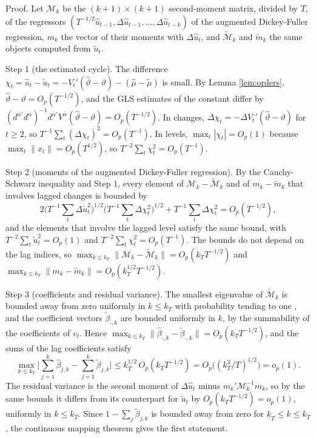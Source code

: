 \documentclass[12pt,a4paper]{article}
\theoremstyle{definition}
\theoremstyle{definition}\newtheorem{example}{Example}
\theoremstyle{definition}\newtheorem{definition}{Definition}
\begin{document}
\noindent Proof. Let $\mathcal M_k$ be the $(k+1)\times(k+1)$ second-moment matrix, divided by $T$, of the regressors $(T^{-1/2}\hat u_{t-1},\Delta\hat u_{t-1},\dots,\Delta\hat u_{t-k})$ of the augmented Dickey-Fuller regression, $m_k$ the vector of their moments with $\Delta\hat u_t$, and $\tilde{\mathcal M}_k$ and $\tilde m_k$ the same objects computed from $\tilde u_t$.

Step 1 (the estimated cycle). The difference $\chi_t=\hat u_t-\tilde u_t=-V_t'(\hat\vartheta-\vartheta)-(\hat\mu-\tilde\mu)$ is small. By Lemma \ref{lem:orders}, $\hat\vartheta-\vartheta=O_p(T^{-1/2})$, and the GLS estimates of the constant differ by $(d^{\bar\alpha\prime}d^{\bar\alpha})^{-1}d^{\bar\alpha\prime}V^{\bar\alpha}(\hat\vartheta-\vartheta)=O_p(T^{-1/2})$. In changes, $\Delta\chi_t=-\Delta V_t'(\hat\vartheta-\vartheta)$ for $t\geq2$, so $T^{-1}\sum_t(\Delta\chi_t)^2=O_p(T^{-1})$. In levels, $\max_t|\chi_t|=O_p(1)$ because $\max_t\|x_t\|=O_p(T^{1/2})$, so $T^{-2}\sum_t\chi_t^2=O_p(T^{-1})$.

Step 2 (moments of the augmented Dickey-Fuller regression). By the Cauchy-Schwarz inequality and Step 1, every element of $\mathcal M_k-\tilde{\mathcal M}_k$ and of $m_k-\tilde m_k$ that involves lagged changes is bounded by
\[
2\Big(T^{-1}\sum_t\Delta\tilde u_t^2\Big)^{1/2}\Big(T^{-1}\sum_t\Delta\chi_t^2\Big)^{1/2}+T^{-1}\sum_t\Delta\chi_t^2=O_p(T^{-1/2}),
\]
and the elements that involve the lagged level satisfy the same bound, with $T^{-2}\sum_t\tilde u_t^2=O_p(1)$ and $T^{-2}\sum_t\chi_t^2=O_p(T^{-1})$. The bounds do not depend on the lag indices, so $\max_{k\leq k_T}\|\mathcal M_k-\tilde{\mathcal M}_k\|=O_p(k_TT^{-1/2})$ and $\max_{k\leq k_T}\|m_k-\tilde m_k\|=O_p(k_T^{1/2}T^{-1/2})$.

Step 3 (coefficients and residual variance). The smallest eigenvalue of $\tilde{\mathcal M}_k$ is bounded away from zero uniformly in $k\leq k_T$ with probability tending to one \citep{Berk1974}, and the coefficient vectors $\tilde\beta_{\cdot,k}$ are bounded uniformly in $k$, by the summability of the coefficients of $v_t$. Hence $\max_{k\leq k_T}\|\hat\beta_{\cdot,k}-\tilde\beta_{\cdot,k}\|=O_p(k_TT^{-1/2})$, and the sums of the lag coefficients satisfy
\[
\max_{k\leq k_T}\Big|\sum_{j=1}^k\hat\beta_{j,k}-\sum_{j=1}^k\tilde\beta_{j,k}\Big|\leq k_T^{1/2}\,O_p(k_TT^{-1/2})=O_p\big((k_T^3/T)^{1/2}\big)=o_p(1).
\]
The residual variance is the second moment of $\Delta\hat u_t$ minus $m_k'\mathcal M_k^{-1}m_k$, so by the same bounds it differs from its counterpart for $\tilde u_t$ by $O_p(k_TT^{-1/2})=o_p(1)$, uniformly in $k\leq k_T$. Since $1-\sum_j\tilde\beta_{j,k}$ is bounded away from zero for $\underline k_T\leq k\leq k_T$, the continuous mapping theorem gives the first statement.
\end{document}
